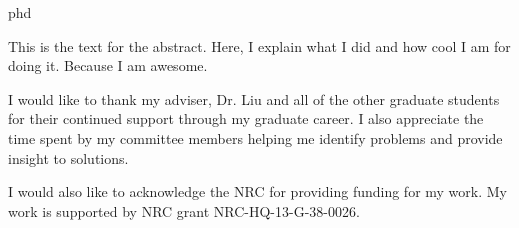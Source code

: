 \documentclass[times,12pt,titlepage]{mstthesis}
\begin{document}

\begin{ThesisTitlePage}{phd}


\author{\MakeUppercase{Edward T. Norris}}








\end{ThesisTitlePage}



\begin{ThesisAbstract}
This is the text for the abstract. Here, I explain what I did and how cool I am for doing it. Because I am awesome.
\end{ThesisAbstract}


\begin{ThesisAcknowledgment}
I would like to thank my adviser, Dr. Liu and all of the other graduate students for their continued support through my graduate career. I also appreciate the time spent by my committee members helping me identify problems and provide insight to solutions. 

I would also like to acknowledge the NRC for providing funding for my work. My work is supported by NRC grant NRC-HQ-13-G-38-0026.
\end{ThesisAcknowledgment}

\begin{ThesisFrontMatter}
\tableofcontents
\listoffigures
\listoftables
\listofsymbols
\end{ThesisFrontMatter}
\end{document}
